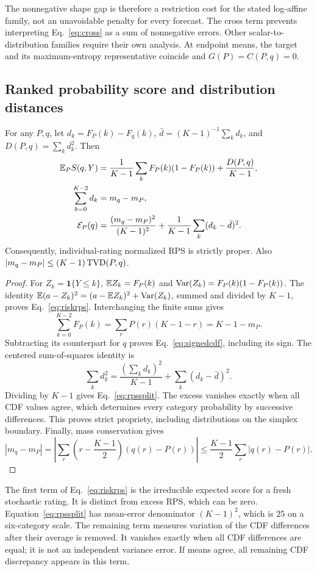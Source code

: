 The nonnegative shape gap is therefore a restriction cost for the stated log-affine family, not an unavoidable penalty for every forecast.
The cross term prevents interpreting Eq.~\eqref{eq:cross} as a sum of nonnegative errors.
Other scalar-to-distribution families require their own analysis.
At endpoint means, the target and its maximum-entropy representative coincide and $G(P)=C(P,q)=0$.

\subsection{Ranked probability score and distribution distances}
\begin{proposition}\label{prop:rps}
For any $P,q$, let $d_k=F_P(k)-F_q(k)$, $\bar d=(K-1)^{-1}\sum_k d_k$, and $D(P,q)=\sum_k d_k^2$.
Then
\begin{align}
 \mathbb{E}_P S(q,Y)&=\frac1{K-1}\sum_k F_P(k)(1-F_P(k))+\frac{D(P,q)}{K-1},\label{eq:riskrps}\\
 \sum_{k=0}^{K-2}d_k&=m_q-m_P,\label{eq:signedcdf}\\
 \mathcal E_P(q)&=\frac{(m_q-m_P)^2}{(K-1)^2}+\frac1{K-1}\sum_k(d_k-\bar d)^2.\label{eq:rpssplit}
\end{align}
Consequently, individual-rating normalized RPS is strictly proper.
Also $|m_q-m_P|\le(K-1)\operatorname{TVD}(P,q)$.
\end{proposition}
\begin{proof}
For $Z_k=\mathbf1\{Y\le k\}$, $\mathbb{E} Z_k=F_P(k)$ and $\operatorname{Var}(Z_k)=F_P(k)(1-F_P(k))$.
The identity $\mathbb{E}(a-Z_k)^2=(a-\mathbb{E} Z_k)^2+\operatorname{Var}(Z_k)$, summed and divided by $K-1$, proves Eq.~\eqref{eq:riskrps}.
Interchanging the finite sums gives
\[
 \sum_{k=0}^{K-2}F_P(k)=\sum_rP(r)(K-1-r)=K-1-m_P.
\]
Subtracting its counterpart for $q$ proves Eq.~\eqref{eq:signedcdf}, including its sign.
The centered sum-of-squares identity is
\[
 \sum_kd_k^2=\frac{(\sum_kd_k)^2}{K-1}+\sum_k(d_k-\bar d)^2.
\]
Dividing by $K-1$ gives Eq.~\eqref{eq:rpssplit}.
The excess vanishes exactly when all CDF values agree, which determines every category probability by successive differences.
This proves strict propriety, including distributions on the simplex boundary.
Finally, mass conservation gives
\[
 |m_q-m_P|=\left|\sum_r\left(r-\frac{K-1}{2}\right)(q(r)-P(r))\right|
 \le\frac{K-1}{2}\sum_r|q(r)-P(r)|.
\]
\end{proof}

The first term of Eq.~\eqref{eq:riskrps} is the irreducible expected score for a fresh stochastic rating.
It is distinct from excess RPS, which can be zero.
Equation~\eqref{eq:rpssplit} has mean-error denominator $(K-1)^2$, which is $25$ on a six-category scale.
The remaining term measures variation of the CDF differences after their average is removed.
It vanishes exactly when all CDF differences are equal; it is not an independent variance error.
If means agree, all remaining CDF discrepancy appears in this term.

